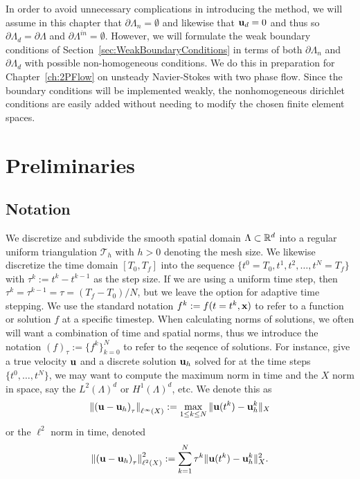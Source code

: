 \documentclass[letterpaper]{erdc}
\begin{document}
In order to avoid unnecessary complications in introducing the method, we will assume in this chapter that $\partial\Lambda_n=\emptyset$ and  likewise that $\textbf{u}_d = 0$ and thus so $\partial\Lambda_d=\partial\Lambda$ and $\partial\Lambda^{in}=\emptyset$.  However, we will formulate the weak boundary conditions of Section~\ref{sec:WeakBoundaryConditions} in terms of both $\partial\Lambda_n$ and $\partial\Lambda_d$ with possible non-homogeneous conditions.  We do this in preparation for Chapter~\ref{ch:2PFlow} on unsteady Navier-Stokes with two phase flow.  Since the boundary conditions will be implemented weakly, the nonhomogeneous dirichlet conditions are easily added without needing to modify the chosen finite element spaces.


%
%
%
\section{Preliminaries}\label{sec:Preliminaries}


%
%
\subsection{Notation}
We discretize and subdivide the smooth spatial domain $\Lambda\subset \mathbb{R}^d$ into a regular uniform triangulation $\mathcal{T}_h$ with $h>0$ denoting the mesh size.  We likewise discretize the time domain $[T_0,T_f]$ into the sequence $\{ t^0=T_0, t^1, t^2, \dots, t^N = T_f\}$  with $\tau^k:= t^k-t^{k-1}$ as the step size.  If we are using a uniform time step, then $\tau^k = \tau^{k-1} = \tau = (T_f-T_0)/N$, but we leave the option for adaptive time stepping.  We use the standard notation $f^{k} := f(t=t^k,\textbf{x})$ to refer to a function or solution $f$ at a specific timestep.  When calculating norms of solutions, we often will want a combination of time and spatial norms,  thus we introduce the notation $\left( f \right)_{\tau}:= \{ f^k \}_{k=0}^{N}$ to refer to the seqence of solutions.  For instance, give a true velocity $\textbf{u}$ and a discrete solution $\textbf{u}_h$ solved for at the time steps $\{t^0,\dots, t^{N}\}$, we may want to compute the maximum norm in time and the $X$ norm in space, say the $L^2(\Lambda)^d$ or $H^1(\Lambda)^d$, etc.  We denote this as
\begin{equation}
  \left\| \left( \textbf{u} - \textbf{u}_h \right)_{\tau} \right\|_{\ell^{\infty}(X)} := \max_{1\leq k \leq N} \| \textbf{u}(t^{k}) - \textbf{u}_h^{k}\|_{X}
\end{equation}
or the $\ell^2$ norm in time, denoted
\begin{equation}
  \left\| \left( \textbf{u} - \textbf{u}_h \right)_{\tau} \right\|^2_{\ell^{2}(X)} :=  \sum_{k=1}^{N} \tau^{k}\| \textbf{u}(t^{k}) - \textbf{u}_h^{k}\|^2_{X}.
\end{equation}
\end{document}
